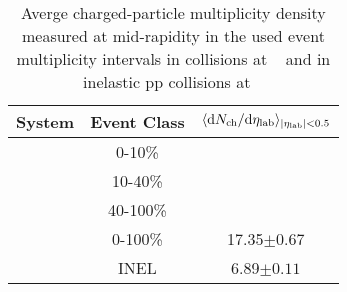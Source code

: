 \begin{table}[!t]
\begin{center}
	\caption{Averge charged-particle multiplicity density measured at mid-rapidity in the used event multiplicity intervals in \pPb collisions at \fivenn~\cite{ALICE:2012xs} and in inelastic pp collisions at \thirteen~\cite{Adam:2015pza}}
	\label{Tab:Multiplicity}
    \begin{tabularx}{\textwidth}{@{} lCC @{}}
    	\toprule
    	System        & Event Class   & $\langle \mathrm{d}N_\mathrm{ch}/\mathrm{d}\eta_\mathrm{lab} \rangle_{|\eta_{\rm lab}| < 0.5}$ \\
  	    \midrule
    	\pPb          & 0-10\%        &    \\
    	              & 10-40\%       &    \\
    	              & 40-100\%      &    \\
    	              & 0-100\%       & 17.35$\pm0.67$ \\
    	\midrule
    	\pp           & INEL          &  6.89$\pm0.11$     \\              
	    \bottomrule
    \end{tabularx}
\end{center}
\end{table}

 



